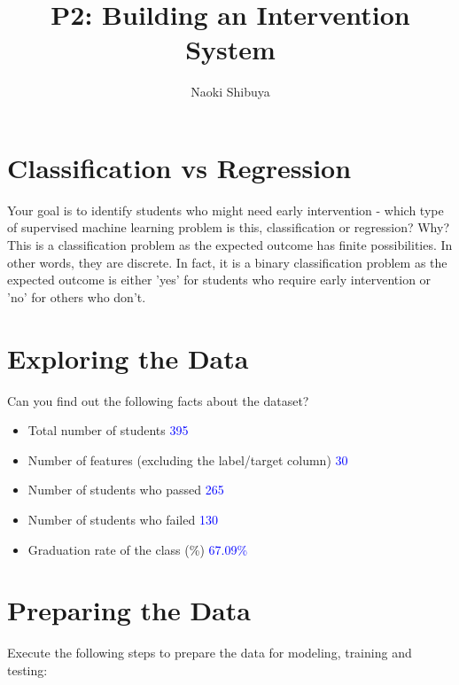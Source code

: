 \documentclass{article}
\title{P2: Building an Intervention System}
\author{Naoki Shibuya}
\date{}
\begin{document}
\maketitle

\section{Classification vs Regression}

Your goal is to identify students who might need early intervention - which type of supervised machine learning problem is this, classification or regression? Why?\\
\color{blue}
This is a classification problem as the expected outcome has finite possibilities. In other words, they are discrete. In fact, it is a binary classification problem as the expected outcome is either 'yes' for students who require early intervention or 'no' for others who don't.
\color{black}

\section{Exploring the Data}

Can you find out the following facts about the dataset?

\begin{itemize}
\item Total number of students \textcolor{blue}{395}
\item Number of features (excluding the label/target column) \textcolor{blue}{30}
\item Number of students who passed \textcolor{blue}{265}
\item Number of students who failed \textcolor{blue}{130}
\item Graduation rate of the class (\%) \textcolor{blue}{67.09\%}
\end{itemize}

\section{Preparing the Data}

Execute the following steps to prepare the data for modeling, training and testing:
\end{document}
